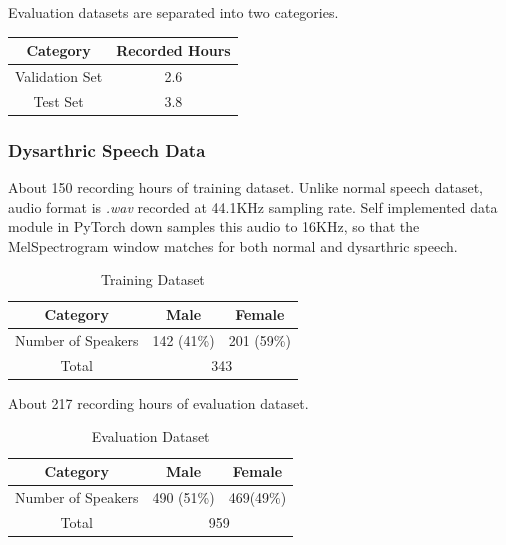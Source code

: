 \documentclass[9pt,final,a4paper]{IEEEtran}
\begin{document}
Evaluation datasets are separated into two categories.

\begin{table}[h]
    \begin{center}
        \begin{tabular}{|c|c|}
            \hline
            Category & Recorded Hours \\ [0.5ex] 
            \hline\hline
            Validation Set & 2.6 \\ 
            \hline
            Test Set & 3.8 \\
            \hline
        \end{tabular}
    \end{center}
\end{table}

\subsubsection{Dysarthric Speech Data}

About 150 recording hours of training dataset. Unlike normal speech dataset, audio format is \emph{.wav} recorded at 44.1KHz sampling rate.
Self implemented data module in PyTorch down samples this audio to 16KHz, so that the MelSpectrogram window matches for both normal and dysarthric speech.

\begin{table}[h]
    \caption*{Training Dataset}
    \vspace*{-3mm}
    \begin{center}
        \begin{tabular}{|c|c|c|}
            \hline
            Category & Male & Female \\ [0.5ex] 
            \hline\hline
            Number of Speakers & 142 (41\%) & 201 (59\%) \\ 
            \hline
            Total & \multicolumn{2}{|c|}{343} \\
            \hline
        \end{tabular}
    \end{center}
\end{table}
About 217 recording hours of evaluation dataset.
\begin{table}[h]
    \caption*{Evaluation Dataset}
    \vspace*{-3mm}
    \begin{center}
        \begin{tabular}{|c|c|c|}
            \hline
            Category & Male & Female \\ [0.5ex] 
            \hline\hline
            Number of Speakers & 490 (51\%) & 469(49\%) \\ 
            \hline
            Total & \multicolumn{2}{|c|}{959} \\
            \hline
        \end{tabular}
    \end{center}
\end{table}
\vspace*{-5mm}
\end{document}
